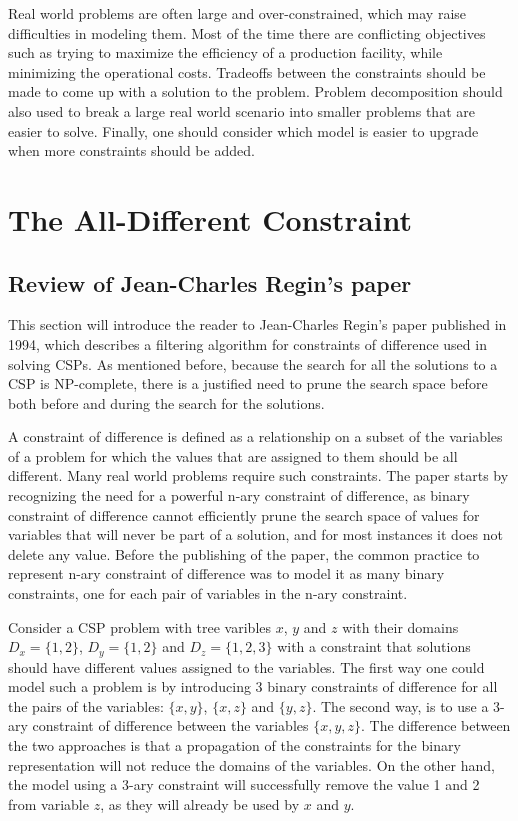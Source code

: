 \documentclass{l4proj}
\begin{document}
\noindent Real world problems are often large and over-constrained, which may raise difficulties in modeling them. Most of the time there are conflicting objectives such as trying to maximize the efficiency of a production facility, while minimizing the operational costs. Tradeoffs between the constraints should be made to come up with a solution to the problem. Problem decomposition should also used to break a large real world scenario into smaller problems that are easier to solve. Finally, one should consider which model is easier to upgrade when more constraints should be added.

\chapter{The All-Different Constraint}
\label{chap3alldiffconstraint}

\section{Review of Jean-Charles Regin's paper}
\noindent This section will introduce the reader to Jean-Charles Regin’s paper published in 1994, which describes a filtering algorithm for constraints of difference used in solving CSPs. As mentioned before, because the search for all the solutions to a CSP is NP-complete, there is a justified need to prune the search space before both before and during the search for the solutions.

\noindent A constraint of difference is defined as a relationship on a subset of the variables of a problem for which the values that are assigned to them should be all different. Many real world problems require such constraints. The paper starts by recognizing the need for a powerful n-ary constraint of difference, as binary constraint of difference cannot efficiently prune the search space of values for variables that will never be part of a solution, and for most instances it does not delete any value. Before the publishing of the paper, the common practice to represent n-ary constraint of difference was to model it as many binary constraints, one for each pair of variables in the n-ary constraint.

\noindent Consider a CSP problem with tree varibles $x$, $y$ and $z$ with their domains $D_x = \{1, 2\}$, $D_y = \{1, 2\}$ and $D_z = \{1, 2, 3\}$ with a constraint that solutions should have different values assigned to the variables. The first way one could model such a problem is by introducing 3 binary constraints of difference for all the pairs of the variables: $\{x, y\}$, $\{x, z\}$ and $\{y, z\}$. The second way, is to use a 3-ary constraint of difference between the variables $\{x, y, z\}$. The difference between the two approaches is that a propagation of the constraints for the binary representation will not reduce the domains of the variables. On the other hand, the model using a 3-ary constraint will successfully remove the value 1 and 2 from variable $z$, as they will already be used by $x$ and $y$.
\end{document}
